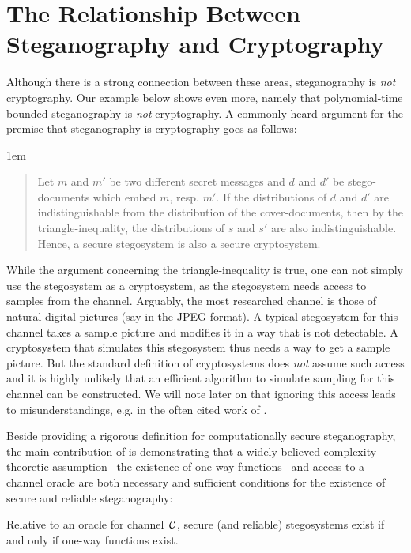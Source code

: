 \section{The Relationship Between Steganography and Cryptography}
Although there is a strong connection between these areas,
steganography is \emph{not} cryptography.
Our example below shows even more, namely that 
polynomial-time bounded steganography is \emph{not} cryptography.
A commonly heard argument for the premise that steganography is 
cryptography goes as follows: 
{\advance\leftmargini 1em
\begin{quote}
  Let $m$ and $m'$ be two different secret messages and 
  $d$ and $d'$ be stego-documents which embed $m$, resp. $m'$. 
  If the distributions of $d$ and $d'$ are indistinguishable 
  from the distribution of the cover-documents,
  then by the triangle-inequality, the distributions of $s$ and $s'$
  are also indistinguishable. Hence, a secure
  stegosystem is also a secure cryptosystem.
\end{quote}}
While the argument concerning the triangle-inequality is true, one can
not simply use the stegosystem as a cryptosystem, as the stegosystem
needs access to samples from the channel. Arguably, the most researched
channel is those of natural digital pictures (say in the \acs{JPEG} format). A
typical stegosystem for this channel
takes a sample picture and
modifies it in a way that is not detectable. A cryptosystem that
simulates this stegosystem thus needs a way to get a sample
picture. But the standard definition of cryptosystems does \emph{not} assume
such access and it is highly unlikely that an efficient 
algorithm to simulate sampling
for this channel can be constructed.  We will note later on
that ignoring this access leads to misunderstandings, e.g. in the often
cited work \cite{hopper2009provably} of \citeauthor{hopper2009provably}.

Beside providing a rigorous definition for computationally secure
steganography, the main contribution of 
\cite{hopper2009provably} is demonstrating that a
widely believed complexity-theoretic assumption \textendash\ the
existence of one-way functions \textendash\ and access to a channel
oracle are both necessary and sufficient conditions for the existence of
secure and reliable steganography:

\begin{theorem}
\label{th:equiv:sec:stego:OWF}
Relative to an oracle for channel~$\mathcal{C}$,
secure (and reliable) stegosystems exist if and only if  
one-way functions exist.
\end{theorem}

